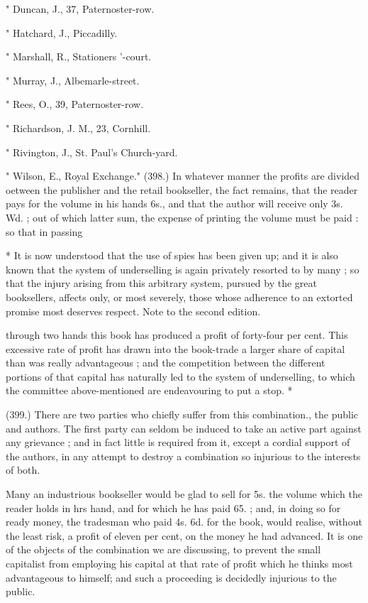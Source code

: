 \documentclass{article}
\begin{document}
" Duncan, J., 37, Paternoster-row.


" Hatchard, J., Piccadilly.


" Marshall, R., Stationers '-court.


" Murray, J., Albemarle-street.


" Rees, O., 39, Paternoster-row.


" Richardson, J. M., 23, Cornhill.


" Rivington, J., St. Paul's Church-yard.


" Wilson, E., Royal Exchange." (398.) In whatever manner the profits are divided oetween the publisher and the retail bookseller, the fact remains, that the reader pays for the volume in his hands 6s., and that the author will receive only 3s. Wd. ; out of which latter sum, the expense of printing the volume must be paid : so that in passing


* It is now understood that the use of spies has been given up; and it is also known that the system of underselling is again privately resorted to by many ; so that the injury arising from this arbitrary system, pursued by the great booksellers, affects only, or most severely, those whose adherence to an extorted promise most deserves respect. Note to the second edition.


through two hands this book has produced a profit of forty-four per cent. This excessive rate of profit has drawn into the book-trade a larger share of capital than was really advantageous ; and the competition between the different portions of that capital has naturally led to the system of underselling, to which the committee above-mentioned are endeavouring to put a stop. *


(399.) There are two parties who chiefly suffer from this combination., the public and authors. The first party can seldom be induced to take an active part against any grievance ; and in fact little is required from it, except a cordial support of the authors, in any attempt to destroy a combination so injurious to the interests of both.


Many an industrious bookseller would be glad to sell for 5s. the volume which the reader holds in hrs hand, and for which he has paid 65. ; and, in doing so for ready money, the tradesman who paid 4s. 6d. for the book, would realise, without the least risk, a profit of eleven per cent, on the money he had advanced. It is one of the objects of the combination we are discussing, to prevent the small capitalist from employing his capital at that rate of profit which he thinks most advantageous to himself; and such a proceeding is decidedly injurious to the public.
\end{document}
